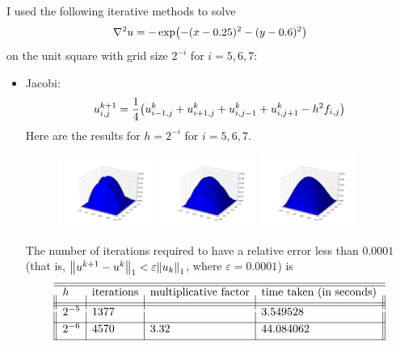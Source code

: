 \documentclass{article} %
\theoremstyle{plain}
\newcommand{\E}{\varepsilon}
\numberwithin{equation}{section} %
\numberwithin{figure}{section} %
\numberwithin{table}{section} %
\begin{document}
I used the following iterative methods to solve
\begin{align*}
    \laplacian u = -\exp(-(x - 0.25)^2 - (y - 0.6)^2)
\end{align*}
on the unit square with grid size $2^{-i}$ for $i = 5,6,7$:
\begin{itemize}
    \item Jacobi:
    \begin{align*}
        u_{i,j}^{k+1} = \frac{1}{4}\qty(u_{i-1,j}^k + u_{i+1,j}^k + u_{i,j-1}^k + u_{i,j+1}^k - h^2f_{i,j})
    \end{align*}
    Here are the results for $h = 2^{-i}$ for $i=5,6,7$.
    \begin{figure}[ht!]
        \centering
        \includegraphics[width=0.3\textwidth]{figure_1_jacobi_0.png}
        \includegraphics[width=0.3\textwidth]{figure_1_jacobi_1.png}
        \includegraphics[width=0.3\textwidth]{figure_1_jacobi_2.png}
    \end{figure}
    \FloatBarrier
    The number of iterations required to have a relative error less than $0.0001$ (that is, $\norm{u^{k+1} - u^k}_1 < \E\norm{u_k}_1$, where $\E = 0.0001$) is
    \begin{align*}
        \begin{array}{||l|l|l|l||}\hline\hline
            h & \text{iterations} & \text{multiplicative factor} & \text{time taken (in seconds)} \\[.1cm]\hline\hline
            2^{-5} & 1377 & & 3.549528 \\[.1cm]\hline
            2^{-6} & 4570 & 3.32 & 44.084062 \\[.1cm]\hline

\end{array}
\end{align*}
\end{itemize}
\end{document}
